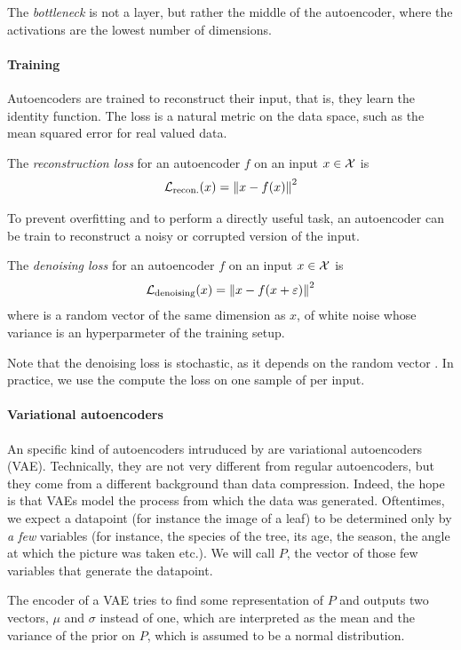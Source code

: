 \documentclass[]{scrarticle}
\begin{document}
The \emph{bottleneck} is not a layer, but rather the middle of the autoencoder,
where the activations are the lowest number of dimensions.

\paragraph{Training}
Autoencoders are trained to reconstruct their input,
that is, they learn the identity function. The loss is a natural metric
on the data space, such as the mean squared error for real valued data.

\begin{definition}
  The \emph{reconstruction loss} for an autoencoder $f$ on an input $x \in \mathcal X$
  is
  \[
    \mathcal L_{\text{recon.}}(x) = \left\| x - f(x) \right\|^2
  \]
\end{definition}

To prevent overfitting and to perform a directly useful task,
an autoencoder can be train to reconstruct a noisy or corrupted
version of the input.
\begin{definition}
  The \emph{denoising loss} for an autoencoder $f$ on an input $x \in \mathcal X$ is
  \[
    \mathcal L_{\text{denoising}}(x) = \left\| x - f(x + \varepsilon) \right\|^2
  \]
  where \e is a random vector of the same dimension as $x$, of white noise
  whose variance is an hyperparmeter of the training setup.

  Note that the denoising loss is stochastic, as it depends on the random
  vector \e. In practice, we use the compute the loss on one sample of \e
  per input.
\end{definition}

\paragraph{Variational autoencoders}
An specific kind of autoencoders intruduced by 
are variational autoencoders (VAE).
Technically, they are not very different from regular autoencoders,
but they come from a different background than data compression.
Indeed, the hope is that VAEs model the process from which the data was generated.
Oftentimes, we expect a datapoint (for instance the image of a leaf) to be determined
only by \textit{a few} variables (for instance, the species of the tree, its age,
the season, the angle at which the picture was taken etc.).
We will call $P$, the vector of those few variables that generate the datapoint.

The encoder of a VAE tries to find some representation of $P$ and outputs two vectors,
$\mu$ and $\sigma$ instead of one, which are interpreted as the mean and the variance
of the prior on $P$, which is assumed to be a normal distribution.
\end{document}
